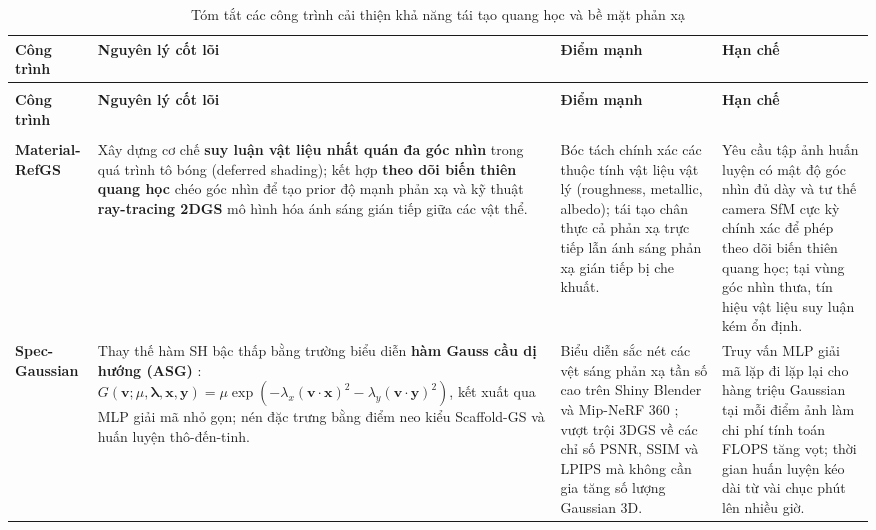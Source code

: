 \begin{xltabular}{\textwidth}
    {
        |>{\raggedright\arraybackslash}p{0.13\textwidth}
        |>{\raggedright\arraybackslash}p{0.31\textwidth}
        |>{\raggedright\arraybackslash}p{0.27\textwidth}
        |>{\raggedright\arraybackslash}p{0.24\textwidth}|
    }
    \caption{Tóm tắt các công trình cải thiện khả năng tái tạo quang học và bề mặt phản xạ}
    \label{tab:rw-quality} \\
    \hline
    \textbf{Công trình} & \textbf{Nguyên lý cốt lõi} & \textbf{Điểm mạnh} & \textbf{Hạn chế} \\
    \hline
    \endfirsthead

     \\
    \hline
    \textbf{Công trình} & \textbf{Nguyên lý cốt lõi} & \textbf{Điểm mạnh} & \textbf{Hạn chế} \\
    \hline
    \endhead

    \hline
     \\
    \endfoot

    \endlastfoot

    \textbf{Material-RefGS} \cite{zhang2025materialrefgs} &
    Xây dựng cơ chế \textbf{suy luận vật liệu nhất quán đa góc nhìn} trong quá trình tô bóng (deferred shading); kết hợp \textbf{theo dõi biến thiên quang học} chéo góc nhìn để tạo prior độ mạnh phản xạ và kỹ thuật \textbf{ray-tracing 2DGS} mô hình hóa ánh sáng gián tiếp giữa các vật thể. &
    Bóc tách chính xác các thuộc tính vật liệu vật lý (roughness, metallic, albedo); tái tạo chân thực cả phản xạ trực tiếp lẫn ánh sáng phản xạ gián tiếp bị che khuất. &
    Yêu cầu tập ảnh huấn luyện có mật độ góc nhìn đủ dày và tư thế camera SfM cực kỳ chính xác để phép theo dõi biến thiên quang học; tại vùng góc nhìn thưa, tín hiệu vật liệu suy luận kém ổn định. \\ \hline

    \textbf{Spec-Gaussian} \cite{yang2024specgaussian} &
    Thay thế hàm SH bậc thấp bằng trường biểu diễn \textbf{hàm Gauss cầu dị hướng (ASG)} \cite{xu2013asg}: $G(\mathbf{v};\mu,\boldsymbol{\lambda},\mathbf{x},\mathbf{y}) = \mu\exp\left(-\lambda_x(\mathbf{v}\cdot\mathbf{x})^2-\lambda_y(\mathbf{v}\cdot\mathbf{y})^2\right)$, kết xuất qua MLP giải mã nhỏ gọn; nén đặc trưng bằng điểm neo kiểu Scaffold-GS \cite{lu2024scaffold} và huấn luyện thô-đến-tinh. &
    Biểu diễn sắc nét các vệt sáng phản xạ tần số cao trên Shiny Blender \cite{verbin2022refnerf} và Mip-NeRF 360 \cite{barron2022mipnerf360}; vượt trội 3DGS về các chỉ số PSNR, SSIM và LPIPS mà không cần gia tăng số lượng Gaussian 3D. &
    Truy vấn MLP giải mã lặp đi lặp lại cho hàng triệu Gaussian tại mỗi điểm ảnh làm chi phí tính toán FLOPS tăng vọt; thời gian huấn luyện kéo dài từ vài chục phút lên nhiều giờ. \\ \hline


\end{xltabular}
